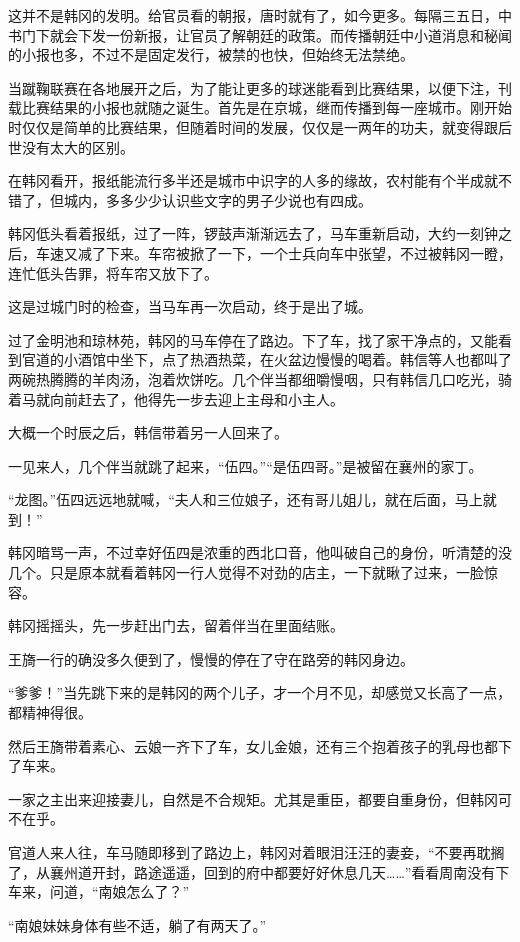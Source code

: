 这并不是韩冈的发明。给官员看的朝报，唐时就有了，如今更多。每隔三五日，中书门下就会下发一份新报，让官员了解朝廷的政策。而传播朝廷中小道消息和秘闻的小报也多，不过不是固定发行，被禁的也快，但始终无法禁绝。

当蹴鞠联赛在各地展开之后，为了能让更多的球迷能看到比赛结果，以便下注，刊载比赛结果的小报也就随之诞生。首先是在京城，继而传播到每一座城市。刚开始时仅仅是简单的比赛结果，但随着时间的发展，仅仅是一两年的功夫，就变得跟后世没有太大的区别。

在韩冈看开，报纸能流行多半还是城市中识字的人多的缘故，农村能有个半成就不错了，但城内，多多少少认识些文字的男子少说也有四成。

韩冈低头看着报纸，过了一阵，锣鼓声渐渐远去了，马车重新启动，大约一刻钟之后，车速又减了下来。车帘被掀了一下，一个士兵向车中张望，不过被韩冈一瞪，连忙低头告罪，将车帘又放下了。

这是过城门时的检查，当马车再一次启动，终于是出了城。

过了金明池和琼林苑，韩冈的马车停在了路边。下了车，找了家干净点的，又能看到官道的小酒馆中坐下，点了热酒热菜，在火盆边慢慢的喝着。韩信等人也都叫了两碗热腾腾的羊肉汤，泡着炊饼吃。几个伴当都细嚼慢咽，只有韩信几口吃光，骑着马就向前赶去了，他得先一步去迎上主母和小主人。

大概一个时辰之后，韩信带着另一人回来了。

一见来人，几个伴当就跳了起来，“伍四。”“是伍四哥。”是被留在襄州的家丁。

“龙图。”伍四远远地就喊，“夫人和三位娘子，还有哥儿姐儿，就在后面，马上就到！”

韩冈暗骂一声，不过幸好伍四是浓重的西北口音，他叫破自己的身份，听清楚的没几个。只是原本就看着韩冈一行人觉得不对劲的店主，一下就瞅了过来，一脸惊容。

韩冈摇摇头，先一步赶出门去，留着伴当在里面结账。

王旖一行的确没多久便到了，慢慢的停在了守在路旁的韩冈身边。

“爹爹！”当先跳下来的是韩冈的两个儿子，才一个月不见，却感觉又长高了一点，都精神得很。

然后王旖带着素心、云娘一齐下了车，女儿金娘，还有三个抱着孩子的乳母也都下了车来。

一家之主出来迎接妻儿，自然是不合规矩。尤其是重臣，都要自重身份，但韩冈可不在乎。

官道人来人往，车马随即移到了路边上，韩冈对着眼泪汪汪的妻妾，“不要再耽搁了，从襄州道开封，路途遥遥，回到的府中都要好好休息几天……”看看周南没有下车来，问道，“南娘怎么了？”

“南娘妹妹身体有些不适，躺了有两天了。”

